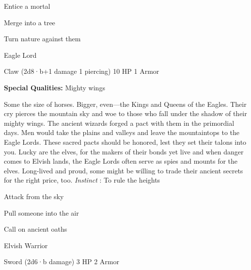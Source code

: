 \startitemize[1,packed]
         
\item Entice a mortal

         
\item Merge into a tree

         
\item Turn nature against them

       
\stopitemize
       
\startMonsterName
Eagle Lord	 
\stopMonsterName
       

Claw (2d8·b+1 damage 1 piercing)	10 HP	1 Armor

       


       
\startMonsterQualities
         {\bf Special Qualities:}  Mighty wings
\stopMonsterQualities
       
\startMonsterDescription
Some the size of horses. Bigger, even—the Kings and Queens of the Eagles. Their cry pierces the mountain sky and woe to those who fall under the shadow of their mighty wings. The ancient wizards forged a pact with them in the primordial days. Men would take the plains and valleys and leave the mountaintops to the Eagle Lords. These sacred pacts should be honored, lest they set their talons into you. Lucky are the elves, for the makers of their bonds yet live and when danger comes to Elvish lands, the Eagle Lords often serve as spies and mounts for the elves. Long-lived and proud, some might be willing to trade their ancient secrets for the right price, too. {\em Instinct} : To rule the heights
\stopMonsterDescription
       
\startitemize[1,packed]
         
\item Attack from the sky

         
\item Pull someone into the air

         
\item Call on ancient oaths

       
\stopitemize
       
\startMonsterName
Elvish Warrior	 
\stopMonsterName
       

Sword (2d6·b damage)	3 HP	2 Armor

       


